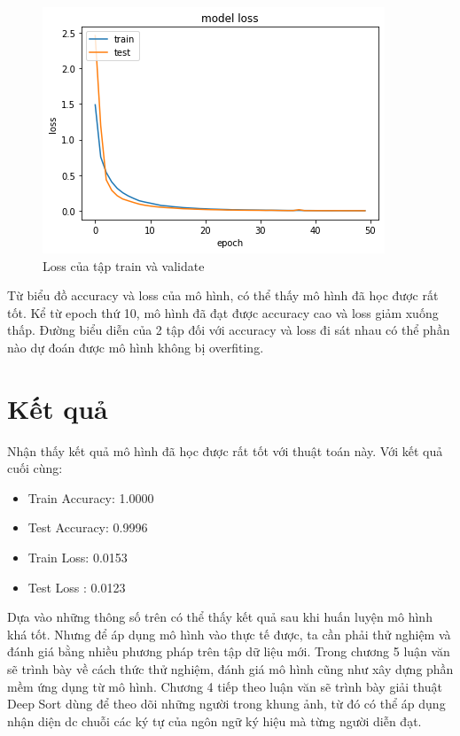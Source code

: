 \FloatBarrier
\begin{figure}[htp]
\begin{center}
\includegraphics[scale=1]{chap4/c4_figs/train_val_l.png}
\end{center}
\caption{Loss của tập train và validate}
\label{fig:pipelineS}
\end{figure}
\FloatBarrier

Từ biểu đồ accuracy và loss của mô hình, có thể thấy mô hình đã học được rất tốt. Kể từ epoch thứ 10, mô hình đã đạt được accuracy cao và loss giảm xuống thấp. Đường biểu diễn của 2 tập đối với accuracy và loss đi sát nhau có thể phần nào dự đoán được mô hình không bị overfiting. 

\section{Kết quả}

Nhận thấy kết quả mô hình đã học được rất tốt với thuật toán này. Với kết quả cuối cùng:
\begin{itemize}
\item Train Accuracy: 1.0000
\item Test Accuracy: 0.9996
\item Train Loss: 0.0153
\item Test Loss    : 0.0123
\end{itemize}

Dựa vào những thông số trên có thể thấy kết quả sau khi huấn luyện mô hình khá tốt. Nhưng để áp dụng mô hình vào thực tế được, ta cần phải thử nghiệm và đánh giá bằng nhiều phương pháp trên tập dữ liệu mới. Trong chương 5 luận văn sẽ trình bày về cách thức thử nghiệm, đánh giá mô hình cũng như xây dựng phần mềm ứng dụng từ mô hình.  Chương 4 tiếp theo luận văn sẽ trình bày giải thuật Deep Sort dùng để theo dõi những người trong khung ảnh, từ đó có thể áp dụng nhận diện dc chuỗi các ký tự của ngôn ngữ ký hiệu mà từng người diễn đạt.














